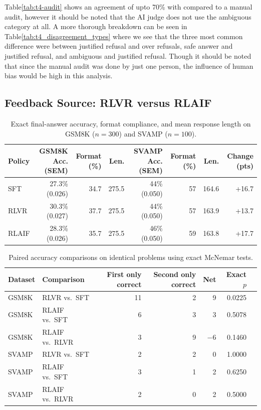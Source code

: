 \documentclass{article}
\begin{document}
Table\ref{tab:t4-audit} shows an agreement of upto 70\% with compared to a manual audit, however it should be noted that the AI judge does not use the ambiguous category at all.
A more thorough breakdown can be seen in Table\ref{tab:t4_disagreement_types} where we see that the three most common difference were between justified refusal and over refusals,
safe answer and justified refusal, and ambiguous and justified refusal. Though it should be noted that since the manual audit was done by just one person, the influence of human bias would be high in this
analysis.

\subsection{Feedback Source: RLVR versus RLAIF}

\begin{table}[H]
\centering
\small
\caption{Exact final-answer accuracy, format compliance, and mean response length on GSM8K ($n=300$) and SVAMP ($n=100$).}
\label{tab:t5-acc}
\begin{tabular}{lrrrrrrr}
\toprule
Policy & GSM8K Acc. (SEM) & Format (\%) & Len. &
SVAMP Acc. (SEM) & Format (\%) & Len. & Change (pts) \\
\midrule
SFT   & 27.3\% (0.026) & 34.7 & 275.5 & 44\% (0.050) & 57 & 164.6 & +16.7 \\
RLVR  & 30.3\% (0.027) & 37.7 & 275.5 & 44\% (0.050) & 57 & 163.9 & +13.7 \\
RLAIF & 28.3\% (0.026) & 35.7 & 275.5 & 46\% (0.050) & 59 & 163.8 & +17.7 \\
\bottomrule
\end{tabular}
\end{table}

\begin{table}[H]
\centering
\small
\caption{Paired accuracy comparisons on identical problems using exact McNemar tests.}
\label{tab:t5-mcn}
\begin{tabular}{llrrrrr}
\toprule
Dataset & Comparison & First only correct &
Second only correct & Net & Exact $p$ \\
\midrule
GSM8K & RLVR vs.\ SFT  & 11 & 2 & 9  & 0.0225 \\
GSM8K & RLAIF vs.\ SFT & 6  & 3 & 3  & 0.5078 \\
GSM8K & RLAIF vs.\ RLVR & 3 & 9 & $-6$ & 0.1460 \\
SVAMP & RLVR vs.\ SFT  & 2 & 2 & 0  & 1.0000 \\
SVAMP & RLAIF vs.\ SFT & 3 & 1 & 2  & 0.6250 \\
SVAMP & RLAIF vs.\ RLVR & 2 & 0 & 2  & 0.5000 \\
\bottomrule
\end{tabular}
\end{table}
\end{document}
